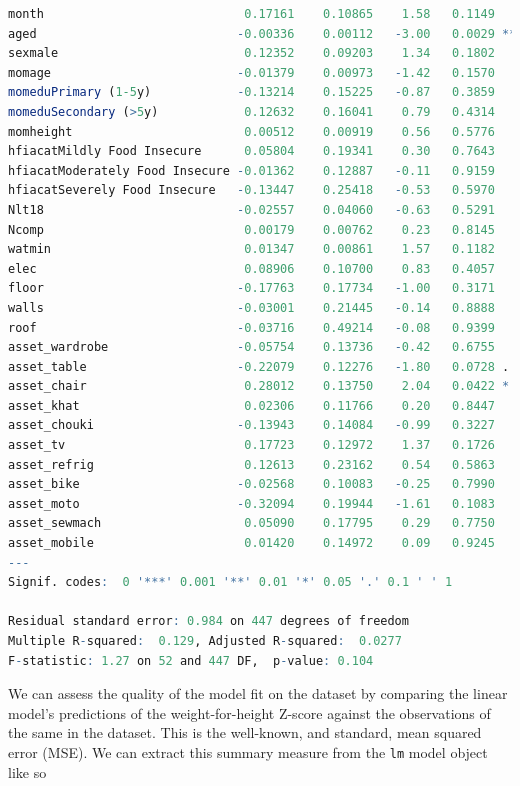 \documentclass[
  12pt, krantz2,
]{krantz}
\newcommand{\passthrough}[1]{#1}
\newcommand{\1}{\mathbbm{1}}
\theoremstyle{definition}
\theoremstyle{definition}
\theoremstyle{definition}
\theoremstyle{definition}
\theoremstyle{remark}
\begin{document}
\begin{lstlisting}[language=R]
month                            0.17161    0.10865    1.58   0.1149   
aged                            -0.00336    0.00112   -3.00   0.0029 **
sexmale                          0.12352    0.09203    1.34   0.1802   
momage                          -0.01379    0.00973   -1.42   0.1570   
momeduPrimary (1-5y)            -0.13214    0.15225   -0.87   0.3859   
momeduSecondary (>5y)            0.12632    0.16041    0.79   0.4314   
momheight                        0.00512    0.00919    0.56   0.5776   
hfiacatMildly Food Insecure      0.05804    0.19341    0.30   0.7643   
hfiacatModerately Food Insecure -0.01362    0.12887   -0.11   0.9159   
hfiacatSeverely Food Insecure   -0.13447    0.25418   -0.53   0.5970   
Nlt18                           -0.02557    0.04060   -0.63   0.5291   
Ncomp                            0.00179    0.00762    0.23   0.8145   
watmin                           0.01347    0.00861    1.57   0.1182   
elec                             0.08906    0.10700    0.83   0.4057   
floor                           -0.17763    0.17734   -1.00   0.3171   
walls                           -0.03001    0.21445   -0.14   0.8888   
roof                            -0.03716    0.49214   -0.08   0.9399   
asset_wardrobe                  -0.05754    0.13736   -0.42   0.6755   
asset_table                     -0.22079    0.12276   -1.80   0.0728 . 
asset_chair                      0.28012    0.13750    2.04   0.0422 * 
asset_khat                       0.02306    0.11766    0.20   0.8447   
asset_chouki                    -0.13943    0.14084   -0.99   0.3227   
asset_tv                         0.17723    0.12972    1.37   0.1726   
asset_refrig                     0.12613    0.23162    0.54   0.5863   
asset_bike                      -0.02568    0.10083   -0.25   0.7990   
asset_moto                      -0.32094    0.19944   -1.61   0.1083   
asset_sewmach                    0.05090    0.17795    0.29   0.7750   
asset_mobile                     0.01420    0.14972    0.09   0.9245   
---
Signif. codes:  0 '***' 0.001 '**' 0.01 '*' 0.05 '.' 0.1 ' ' 1

Residual standard error: 0.984 on 447 degrees of freedom
Multiple R-squared:  0.129, Adjusted R-squared:  0.0277 
F-statistic: 1.27 on 52 and 447 DF,  p-value: 0.104
\end{lstlisting}

We can assess the quality of the model fit on the dataset by comparing the
linear model's predictions of the weight-for-height Z-score against the
observations of the same in the dataset. This is the well-known, and standard,
mean squared error (MSE). We can extract this summary measure from the \passthrough{\lstinline!lm!}
model object like so
\end{document}
